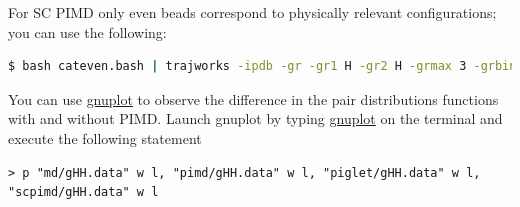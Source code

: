 \documentclass{article}
\begin{document}
\begin{Exercise}[label={ch5},title={PIMD in the strong quantum regime:  gas phase Methanium}]
For SC PIMD only even beads correspond to physically relevant configurations; you can use the following:
\begin{lstlisting}[language=bash]
$ bash cateven.bash | trajworks -ipdb -gr -gr1 H -gr2 H -grmax 3 -grbins 200 -hwin triangle -hwinfac 1 > gHH.data
\end{lstlisting}

\Question
You can use \url{gnuplot} to observe the difference in the pair distributions functions with and without PIMD. 
Launch gnuplot by typing \url{gnuplot} on the terminal and execute the following statement 
\begin{lstlisting}[language=gnuplot]
> p "md/gHH.data" w l, "pimd/gHH.data" w l, "piglet/gHH.data" w l, "scpimd/gHH.data" w l
\end{lstlisting}

\end{Exercise}
\end{document}
